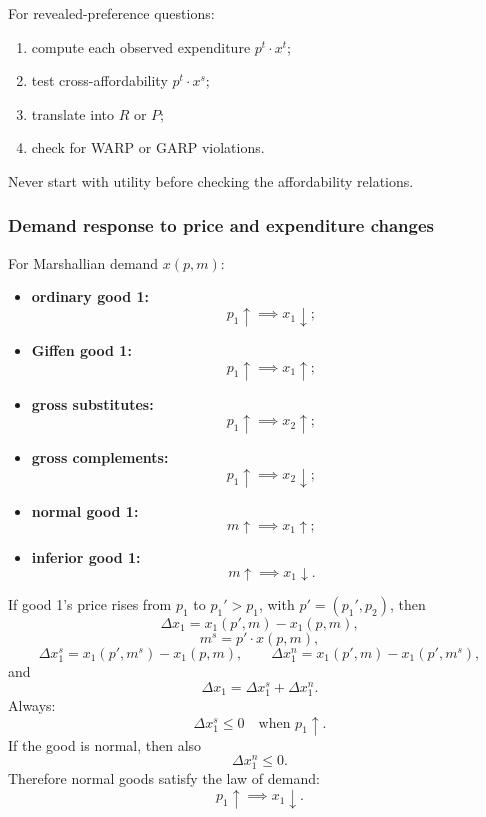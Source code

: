 \begin{examtip}
For revealed-preference questions:
\begin{enumerate}
    \item compute each observed expenditure $p^t\cdot x^t$;
    \item test cross-affordability $p^t\cdot x^s$;
    \item translate into $R$ or $P$;
    \item check for WARP or GARP violations.
\end{enumerate}
Never start with utility before checking the affordability relations.
\end{examtip}

\subsubsection{Demand response to price and expenditure changes}

\begin{keyformula}[title={Key Formula: demand classifications}]
For Marshallian demand $x(p,m)$:
\begin{itemize}
    \item \textbf{ordinary good 1:}
    \[
    p_1 \uparrow \implies x_1 \downarrow;
    \]
    \item \textbf{Giffen good 1:}
    \[
    p_1 \uparrow \implies x_1 \uparrow;
    \]
    \item \textbf{gross substitutes:}
    \[
    p_1 \uparrow \implies x_2 \uparrow;
    \]
    \item \textbf{gross complements:}
    \[
    p_1 \uparrow \implies x_2 \downarrow;
    \]
    \item \textbf{normal good 1:}
    \[
    m \uparrow \implies x_1 \uparrow;
    \]
    \item \textbf{inferior good 1:}
    \[
    m \uparrow \implies x_1 \downarrow.
    \]
\end{itemize}
\end{keyformula}

\begin{keyformula}[title={Key Formula: Slutsky decomposition}]
If good 1's price rises from $p_1$ to $p_1'>p_1$, with $p'=(p_1',p_2)$, then
\[
\Delta x_1 = x_1(p',m)-x_1(p,m),
\]
\[
m^s = p' \cdot x(p,m),
\]
\[
\Delta x_1^s = x_1(p',m^s)-x_1(p,m),
\qquad
\Delta x_1^n = x_1(p',m)-x_1(p',m^s),
\]
and
\[
\Delta x_1 = \Delta x_1^s + \Delta x_1^n.
\]
Always:
\[
\Delta x_1^s \le 0
\quad \text{when } p_1 \uparrow.
\]
If the good is normal, then also
\[
\Delta x_1^n \le 0.
\]
Therefore normal goods satisfy the law of demand:
\[
p_1 \uparrow \implies x_1 \downarrow.
\]
\end{keyformula}

